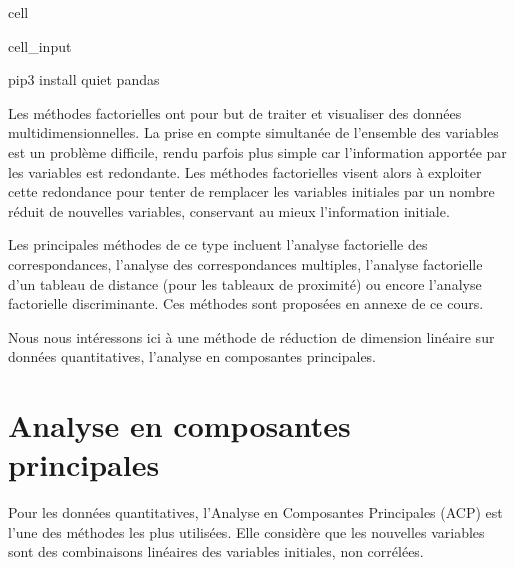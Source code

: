 \documentclass[letterpaper,10pt,french]{sphinxmanual}
\begin{document}
\begin{sphinxuseclass}{cell}
\begin{sphinxuseclass}{cell_input}
\begin{sphinxVerbatim}[commandchars=\\\{\}]
      
  
    pip3 install \PYGZhy{}\PYGZhy{}quiet pandas
\end{sphinxVerbatim}

\end{sphinxuseclass}
\end{sphinxuseclass}
\sphinxAtStartPar
Les méthodes factorielles ont pour but de traiter et visualiser des données multidimensionnelles. La prise en compte simultanée de l’ensemble des variables est un problème difficile, rendu parfois plus simple car l’information apportée par les variables est redondante. Les méthodes factorielles visent alors à exploiter cette redondance pour tenter de remplacer les variables initiales par un nombre réduit de nouvelles variables, conservant au mieux l’information initiale.

\sphinxAtStartPar
Les principales méthodes de ce type incluent l’analyse factorielle des correspondances, l’analyse des correspondances multiples, l’analyse factorielle d’un tableau de distance (pour les tableaux de proximité) ou encore l’analyse factorielle discriminante. Ces méthodes sont proposées en annexe de ce cours.

\sphinxAtStartPar
Nous nous intéressons ici à une méthode de réduction de dimension linéaire sur données quantitatives, l’analyse en composantes principales.


\chapter{Analyse en composantes principales}
\label{\detokenize{acp:analyse-en-composantes-principales}}\label{\detokenize{acp::doc}}
\ignorespaces 
{}\ignorespaces 
\sphinxAtStartPar
Pour les données quantitatives, l’Analyse en Composantes Principales (ACP) est l’une des méthodes les plus utilisées. Elle considère que les nouvelles variables sont des combinaisons linéaires des variables initiales, non corrélées.

\sphinxAtStartPar
{}
\end{document}
